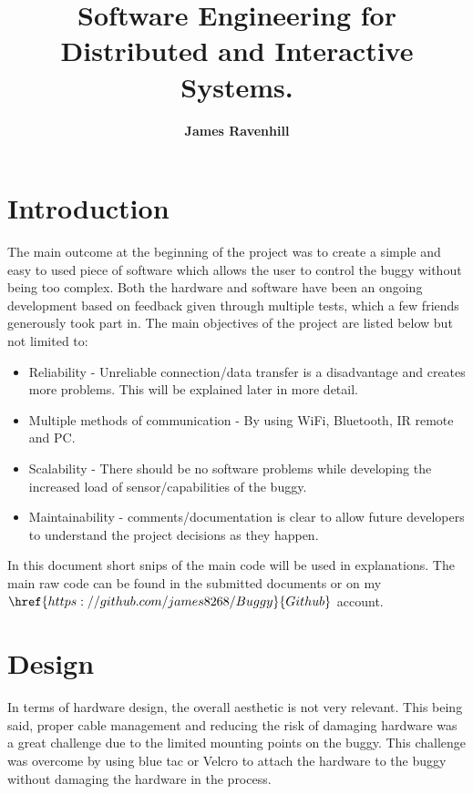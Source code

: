 \documentclass[8pt, a4paper]{article}
\begin{document}
\setlength \topmargin{-1in}
\title{\textbf{Software Engineering for Distributed and Interactive Systems.}}
\author{\textbf{James Ravenhill}}
\date{}
\maketitle

\section{Introduction} 

The main outcome at the beginning of the project was to create a simple and easy to used piece of software which allows the user to control the buggy without being too complex. Both the hardware and software have been an ongoing development based on feedback given through multiple tests, which a few friends generously took part in. The main objectives of the project are listed below but not limited to:

\begin{itemize}
	\item Reliability - Unreliable connection/data transfer is a disadvantage and creates more problems. This will be explained later in more detail.  
	\item  Multiple methods of communication - By using WiFi, Bluetooth, IR remote and PC. 
	\item Scalability - There should be no software problems while developing the increased load of sensor/capabilities of the buggy. 
	\item Maintainability - comments/documentation is clear to allow future developers to understand the project decisions as they happen.  
\end{itemize}

In this document short snips of the main code will be used in explanations. The main raw code can be found in the submitted documents or on my $\href{https://github.com/james8268/Buggy}{Github}$ account.
 

\section{Design}
In terms of hardware design, the overall aesthetic is not very relevant. This being said, proper cable management and reducing the risk of damaging hardware was a great challenge due to the limited mounting points on the buggy. This challenge was overcome by using blue tac or Velcro to attach the hardware to the buggy without damaging the hardware in the process. 
\end{document}
